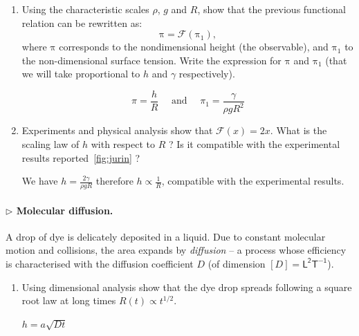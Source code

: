 \documentclass[11pt,a4paper]{article}
\begin{document}
\begin{enumerate}
\item Using the characteristic scales $\rho$, $g$ and $R$, show that the previous functional relation can be rewritten as:
\begin{equation}
\mathrm \pi = \mathcal F(\mathrm \pi_1),
\end{equation}
where $\mathrm \pi$ corresponds to the nondimensional height (the observable), and $\mathrm\pi_1$ to the non-dimensional surface tension. Write the expression for $\mathrm\pi$ and $\mathrm\pi_1$ (that we will take proportional to $h$ and $\gamma$ respectively).
\begin{answer}
\begin{equation*}
\pi = \frac{h}{R} \quad \text{ and } \quad \pi_1 = \frac{\gamma}{\rho g R^2}
\end{equation*}
\end{answer}

\item Experiments and physical analysis show that $\mathcal F(x) = 2x$. What is the scaling law of $h$ with respect to $R$ ? Is it compatible with the experimental results reported~\ref{fig:jurin} ?
\begin{answer}
We have $h = \frac{2\gamma}{\rho g R}$ therefore $h \propto \frac{1}{R}$, compatible with the experimental results.
\end{answer}
\end{enumerate}

\paragraph{$\rhd$ Molecular diffusion.} A drop of dye is delicately deposited in a liquid. Due to constant molecular motion and collisions, the area expands by \textit{diffusion} -- a process whose efficiency is characterised with the diffusion coefficient $D$ (of dimension $[D] = \mathsf{L^2T^{-1}}$). 
\begin{enumerate}[resume]
\item Using dimensional analysis show that the dye drop spreads following a square root law at long times $R(t) \propto t^{1/2}$.
\begin{answer}
$h = a \sqrt{Dt}$
\end{answer}
\end{enumerate}
\end{document}
